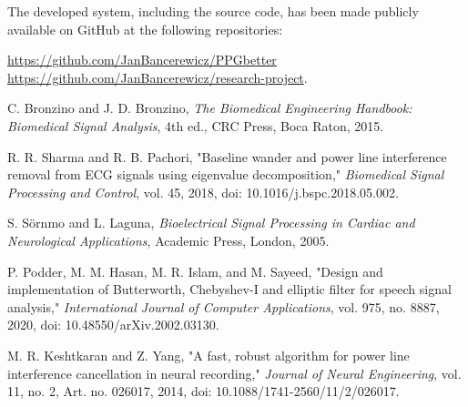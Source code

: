 \documentclass{citask}
\begin{document}
\newpage

The developed system, including the source code, has been made publicly available on GitHub at the following repositories:

\noindent
\href{https://github.com/JanBancerewicz/PPGbetter}{https://github.com/JanBancerewicz/PPGbetter} \\
\href{https://github.com/JanBancerewicz/research-project}{https://github.com/JanBancerewicz/research-project}.


 \newpage

\begin{thebibliography}{1}
C. Bronzino and J. D. Bronzino, \emph{The Biomedical Engineering Handbook: Biomedical Signal Analysis}, 4th ed., CRC Press, Boca Raton, 2015.

R. R. Sharma and R. B. Pachori, "Baseline wander and power line interference removal from ECG signals using eigenvalue decomposition," \emph{Biomedical Signal Processing and Control}, vol. 45, 2018, doi: 10.1016/j.bspc.2018.05.002.

S. Sörnmo and L. Laguna, \emph{Bioelectrical Signal Processing in Cardiac and Neurological Applications}, Academic Press, London, 2005.

P. Podder, M. M. Hasan, M. R. Islam, and M. Sayeed, "Design and implementation of Butterworth, Chebyshev-I and elliptic filter for speech signal analysis," \emph{International Journal of Computer Applications}, vol. 975, no. 8887, 2020, doi: 10.48550/arXiv.2002.03130.

M. R. Keshtkaran and Z. Yang, "A fast, robust algorithm for power line interference cancellation in neural recording," \emph{Journal of Neural Engineering}, vol. 11, no. 2, Art. no. 026017, 2014, doi: 10.1088/1741-2560/11/2/026017.


\end{thebibliography}
\end{document}

